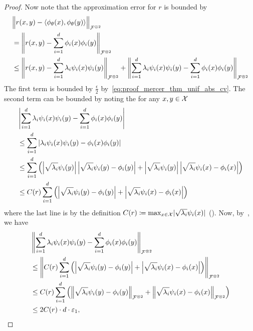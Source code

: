 \begin{proof}
	Now note that the approximation error for $r$ is bounded by
	\begin{equation}\label{eq:proof_approx_bound}
		\begin{split}
			&\bignorm{r(x,y) - \langle \phi_\theta(x), \phi_\theta(y) \rangle}_{\calF^{\otimes 2}}\\
			&= \norm{ r(x,y) - \sum_{i=1}^{d}{\phi_i(x) \phi_i(y)}}_{\calF^{\otimes 2}} \\
			&\leq \norm{ r(x,y) - \sum_{i=1}^{d}{\lambda_i \psi_i(x) \psi_i(y)}}_{\calF^{\otimes 2}} + \norm{\sum_{i=1}^{d}\lambda_i \psi_i(x) \psi_i(y) - \sum_{i=1}^{d}\phi_i(x) \phi_i(y)}_{\calF^{\otimes 2}}
		\end{split}
	\end{equation}
	The first term is bounded by $\frac{\epsilon}{2}$ by~\eqref{eq:proof_mercer_thm_unif_abs_cv}. The second term can be bounded by noting the for any $x, y \in {\mathcal{X}}$
	\begin{equation*}
		\begin{split}
			&\abs{\sum_{i=1}^{d}\lambda_i \psi_i(x) \psi_i(y) - \sum_{i=1}^{d}\phi_i(x) \phi_i(y)} \\
			&\leq \sum_{i=1}^{d}{ \abs{ \lambda_i \psi_i(x) \psi_i(y) - \phi_i(x) \phi_i(y)}} \\
			&\leq \sum_{i=1}^{d}{\paren{
				\abs{\sqrt{\lambda_i} \psi_i(y)} \abs{\sqrt{\lambda_i} \psi_i(y) - \phi_i(y)}
				+ \abs{\sqrt{\lambda_i} \psi_i(y)} \abs{\sqrt{\lambda_i} \psi_i(x) - \phi_i(x)}
				}} \\
			&\leq C(r) \sum_{i=1}^{d}{\paren{
				\abs{\sqrt{\lambda_i} \psi_i(y) - \phi_i(y)}
				+ \abs{\sqrt{\lambda_i} \psi_i(x) - \phi_i(x)}
				}} \\
		\end{split}
	\end{equation*}
	where the last line is by the definition $C(r) \coloneqq \max_{x \in {\mathcal{X}}} \lvert \sqrt{\lambda_i} \psi_i(x) \rvert$ (). Now, by~, we have
	\begin{align*}
		&\norm{\sum_{i=1}^{d}\lambda_i \psi_i(x) \psi_i(y) - \sum_{i=1}^{d}\phi_i(x) \phi_i(y)}_{\calF^{\otimes 2}} \\
		&\leq \norm{C(r) \sum_{i=1}^{d}{\paren{\abs{\sqrt{\lambda_i} \psi_i(y) - \phi_i(y)} + \abs{\sqrt{\lambda_i} \psi_i(x) - \phi_i(x)}}}}_{\calF^{\otimes 2}}\\
		&\leq C(r) \sum_{i=1}^{d}\paren{\norm{\sqrt{\lambda_i} \psi_i(y) - \phi_i(y)}_{\calF^{\otimes 2}} + \norm{\sqrt{\lambda_i} \psi_i(x) - \phi_i(x)}_{\calF^{\otimes 2}}}\\
		&\leq 2 C(r) \cdot d \cdot \epsilon_1,
	\end{align*}


\end{proof}
